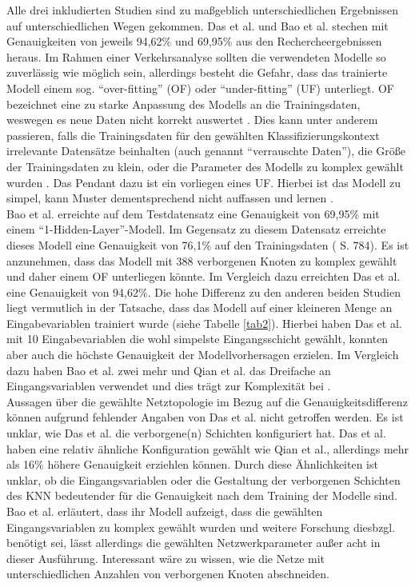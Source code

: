 \documentclass{scrartcl}
\begin{document}
Alle drei inkludierten Studien sind zu maßgeblich unterschiedlichen Ergebnissen
auf unterschiedlichen Wegen gekommen. Das et al. und Bao et al. stechen
mit Genauigkeiten von jeweils 94,62\% und 69,95\% aus den Rechercheergebnissen
heraus. Im Rahmen einer Verkehrsanalyse sollten die verwendeten Modelle so
zuverlässig wie möglich sein, allerdings besteht die Gefahr, dass das trainierte
Modell einem sog. \enquote{over-fitting} (OF) oder \enquote{under-fitting} (UF)
unterliegt. OF bezeichnet eine zu starke Anpassung des Modells an die Trainingsdaten,
weswegen es neue Daten nicht korrekt auswertet \cite{aws}.
Dies kann unter anderem passieren, falls die Trainingsdaten für den gewählten
Klassifizierungskontext irrelevante Datensätze beinhalten
(auch genannt \enquote{verrauschte Daten}), die Größe der Trainingsdaten
zu klein, oder die Parameter des Modells zu komplex
gewählt wurden \cite{aws}. Das Pendant dazu ist ein vorliegen eines UF.
Hierbei ist das Modell zu simpel, kann Muster dementsprechend nicht auffassen
und lernen \cite{ibm2}.
\medskip \\
Bao et al. erreichte auf dem Testdatensatz eine Genauigkeit von 69,95\% mit
einem \enquote{1-Hidden-Layer}-Modell. Im Gegensatz zu diesem Datensatz
erreichte dieses Modell
eine Genauigkeit von 76,1\% auf den Trainingsdaten (\cite{bao} S. 784).
Es ist anzunehmen, dass das Modell mit 388 verborgenen Knoten zu
komplex gewählt und daher einem OF unterliegen könnte.
Im Vergleich dazu erreichten Das et al. eine Genauigkeit von 94,62\%.
Die hohe Differenz zu den anderen beiden Studien liegt vermutlich in der Tatsache,
dass das Modell auf einer kleineren Menge an Eingabevariablen trainiert wurde
(siehe Tabelle \ref{tab2}). Hierbei haben Das et al. mit 10 Eingabevariablen
die wohl simpelste Eingangsschicht gewählt, konnten aber auch die höchste Genauigkeit 
der Modellvorhersagen erzielen. Im Vergleich dazu haben Bao et al. zwei mehr und
Qian et al. das Dreifache an Eingangsvariablen verwendet und dies trägt zur 
Komplexität bei \cite{aws}.
\medskip \\
Aussagen über die gewählte Netztopologie im Bezug auf die Genauigkeitsdifferenz
können aufgrund fehlender Angaben von Das et al. nicht getroffen werden. Es ist unklar,
wie Das et al. die verborgene(n) Schichten konfiguriert hat.
Das et al. haben eine relativ ähnliche Konfiguration gewählt wie Qian et al., allerdings
mehr als 16\% höhere Genauigkeit erziehlen können.
Durch diese Ähnlichkeiten ist unklar, ob die Eingangsvariablen
oder die Gestaltung der verborgenen Schichten des KNN bedeutender für die Genauigkeit nach
dem Training der Modelle sind.
\medskip \\
Bao et al. erläutert, dass ihr Modell aufzeigt, dass die gewählten Eingangsvariablen zu
komplex gewählt wurden und weitere Forschung diesbzgl. benötigt sei, lässt allerdings die
gewählten Netzwerkparameter außer acht in dieser Ausführung. Interessant wäre zu wissen,
wie die Netze mit unterschiedlichen Anzahlen von verborgenen Knoten abschneiden.
\end{document}
